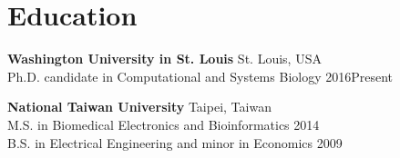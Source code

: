 \section{Education}

\begin{outerlist}

\item \textbf{Washington University in St. Louis} \hfill
	St. Louis, USA \\
	Ph.D. candidate in Computational and Systems Biology \hfill
	2016\textendash Present

\item \textbf{National Taiwan University} \hfill
	Taipei, Taiwan \\
	M.S. in Biomedical Electronics and Bioinformatics \hfill
	2014 \\
	B.S. in Electrical Engineering and minor in Economics \hfill
	2009 \\

\end{outerlist}
